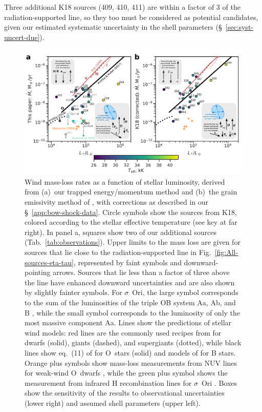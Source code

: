 Three additional K18 sources (409, 410, 411) are within a factor of 3
of the radiation-supported line, so they too must be considered as
potential candidates, given our estimated systematic uncertainty in
the shell parameters (\S~\ref{sec:syst-uncert-due}).




\begin{figure}
  \centering
  \includegraphics[width=\linewidth]{figs/Mdot-vs-lum-combo-edited}
  \caption{Wind mass-loss rates as a function of stellar luminosity,
    derived from (a)~our trapped energy/momentum method and (b)~the
    grain emissivity method of \citet{Kobulnicky:2018a}, with
    corrections as described in our \S~\ref{app:bow-shock-data}.
    Circle symbols show the sources from K18, colored according to the
    stellar effective temperature (see key at far right). In panel a,
    squares show two of our additional sources
    (Tab.~\ref{tab:observations}). Upper limits to the mass loss are
    given for sources that lie close to the radiation-supported line
    in Fig.~\ref{fig:All-sources-eta-tau}, represented by faint
    symbols and downward-pointing arrows.  Sources that lie less than
    a factor of three above the line have enhanced downward
    uncertainties and are also shown by slightly fainter symbols.  For
    \(\sigma\)~Ori, the large symbol corresponds to the sum of the
    luminosities of the triple OB system Aa, Ab, and B
    \citep{Simon-Diaz:2015a}, while the small symbol corresponds to
    the luminosity of only the most massive component Aa.  Lines show
    the predictions of stellar wind models: red lines are the commonly
    used recipes from \citet{Vink:2000a} for dwarfs (solid), giants
    (dashed), and supergiants (dotted), while black lines show
    eq.~(11) of \citet{Krticka:2017a} for O~stars (solid) and models
    of \citet{Krticka:2014a} for B stars.  Orange plus symbols show
    mass-loss measurements from NUV lines for weak-wind O~dwarfs
    \citep{Marcolino:2009a}, while the green plus symbol shows the
    measurement from infrared H recombination lines for \(\sigma\)~Ori
    \citep{Najarro:2011a}.  Boxes show the sensitivity of the results
    to observational uncertainties (lower right) and assumed shell
    parameters (upper left).}
  \label{fig:mass-loss-vs-luminosity}
\end{figure}


